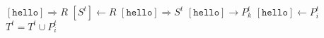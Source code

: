 \documentclass{article}
\begin{document}
\pagestyle{empty}

\newcommand{\send}{\Rightarrow}
\newcommand{\sendto}{\rightarrow}
\algrenewcommand{}

\begin{algorithmic}
  \State $[\mathtt{hello}] \send R$
  \State $[S^t] \gets R$
  \State $[\mathtt{hello}] \send S^t$
  \State $[\mathtt{hello}]\sendto P^t_k$
  \EndFor
  \EndProcedure
  \newline
  \State $[\mathtt{hello}] \gets P^t_i$
  \State $T^t = T^t \cup P^t_i$
  \EndWhile
  \EndProcedure
  
\end{algorithmic}
\end{document}
